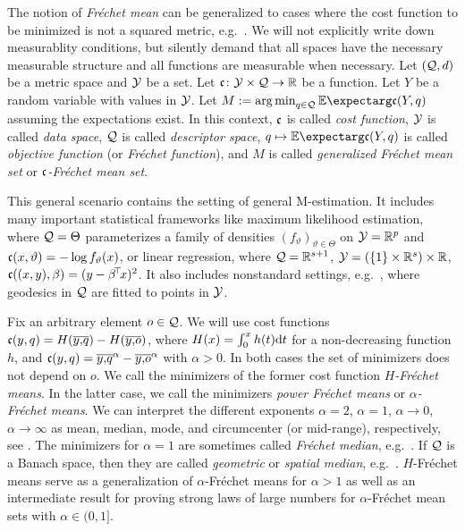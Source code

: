 The notion of \textit{Fréchet mean} can be generalized to cases where the cost function to be minimized is not a squared metric, e.g.\ \cite{huckemann11}. We will not explicitly write down measurablity conditions, but silently demand that all spaces have the necessary measurable structure and all functions are measurable when necessary. Let $(\mathcal{Q}, d)$ be a metric space and $\mathcal{Y}$ be a set. Let $\mathfrak{c} \colon \mathcal{Y} \times \mathcal{Q} \to \mathbb{R}$ be a function. Let $Y$ be a random variable with values in $\mathcal{Y}$. Let $M := \argmin_{q\in\mc Q} \Ex{\mf c(Y, q)}$ assuming the expectations exist. 
In this context, $\mathfrak{c}$ is called \textit{cost function}, $\mathcal{Y}$ is called \textit{data space}, $\mathcal{Q}$ is called \textit{descriptor space}, $q\mapsto\Ex{\mf c(Y, q)}$ is called \textit{objective function} (or \textit{Fréchet function}), and $M$ is called \textit{generalized Fréchet mean set} or \textit{$\mathfrak{c}$-Fréchet mean set}. 

This general scenario contains the setting of general M-estimation. It includes many important statistical frameworks like maximum likelihood estimation, where $\mathcal{Q} = \Theta$ parameterizes a family of densities $(f_\vartheta)_{\vartheta\in\Theta}$ on $\mathcal{Y} = \mathbb{R}^p$ and $\mathfrak{c}(x,\vartheta) = -\log f_{\vartheta}(x)$, or linear regression, where $\mathcal{Q} = \mathbb{R}^{s+1}$, $\mathcal{Y} = (\{1\}\times\mathbb{R}^s) \times \mathbb{R}$, $\mathfrak{c}((x,y),\beta) = (y - \beta\!^\top\! x)^2$. It also includes nonstandard settings, e.g.\ \cite{huckemann11}, where geodesics in $\mathcal{Q}$ are fitted to points in $\mathcal{Y}$.

Fix an arbitrary element $o\in\mathcal{Q}$. We will use cost functions $\mathfrak{c}(y, q) = H(\overline{y,\!q})-H(\overline{y,\!o})$, where $H(x) = \int_0^x h(t) \mathrm{d} t$ for a non-decreasing function $h$, and $\mathfrak{c}(y, q) = \overline{y,\!q}^\alpha-\overline{y,\!o}^\alpha$ with $\alpha>0$. In both cases the set of minimizers does not depend on $o$. We call the minimizers of the former cost function \textit{$H$-Fréchet means}. In the latter case, we call the minimizers \textit{power Fréchet means} or \textit{$\alpha$-Fréchet means}. We can interpret the different exponents $\alpha = 2$, $\alpha =1$, $\alpha \to 0$, $\alpha \to \infty$ as mean, median, mode, and circumcenter (or mid-range), respectively, see \cite{macqueen67}. The minimizers for $\alpha=1$ are sometimes called \textit{Fréchet median}, e.g.\ \cite{arnaudon13}. If $\mathcal{Q}$ is a Banach space, then they are called \textit{geometric} or \textit{spatial median}, e.g.\ \cite{kemperman87}.
$H$-Fréchet means serve as a generalization of $\alpha$-Fréchet means for $\alpha>1$ as well as an intermediate result for proving strong laws of large numbers for $\alpha$-Fréchet mean sets with $\alpha\in(0,1]$.

